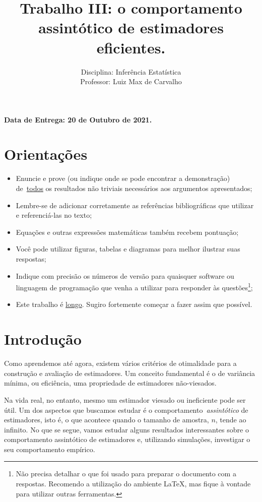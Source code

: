 \documentclass[a4paper,10pt, notitlepage]{report}
\title{Trabalho III: o comportamento assintótico de estimadores eficientes.}
\author{Disciplina: Inferência Estatística \\ Professor: Luiz Max de Carvalho}
\begin{document}
\maketitle

\textbf{Data de Entrega: 20 de Outubro de 2021.}

\section*{Orientações}
\begin{itemize}
 \item Enuncie e prove (ou indique onde se pode encontrar a demonstração) de~\underline{todos} os resultados não triviais necessários aos argumentos apresentados;
 \item Lembre-se de adicionar corretamente as referências bibliográficas que utilizar e referenciá-las no texto;
 \item Equações e outras expressões matemáticas também recebem pontuação;
 \item Você pode utilizar figuras, tabelas e diagramas para melhor ilustrar suas respostas;
 \item Indique com precisão os números de versão para quaisquer software ou linguagem de programação que venha a utilizar para responder às questões\footnote{Não precisa detalhar o que foi usado para preparar o documento com a respostas. Recomendo a utilização do ambiente LaTeX, mas fique à vontade para utilizar outras ferramentas.};
 \item Este trabalho é \underline{longo}.
 Sugiro fortemente começar a fazer assim que possível.
 \end{itemize}


\section*{Introdução}

Como aprendemos até agora, existem vários critérios de otimalidade para a construção e avaliação de estimadores.
Um conceito fundamental é o de variância mínima, ou eficiência, uma propriedade de estimadores não-viesados.

Na vida real, no entanto, mesmo um estimador viesado ou ineficiente pode ser útil.
Um dos aspectos que buscamos estudar é o comportamento~\textit{assintótico} de estimadores, isto é, o que acontece quando o tamanho de amostra, $n$, tende ao infinito.
No que se segue, vamos estudar alguns resultados interessantes sobre o comportamento assintótico de estimadores e, utilizando simulações, investigar o seu comportamento empírico.
\end{document}
